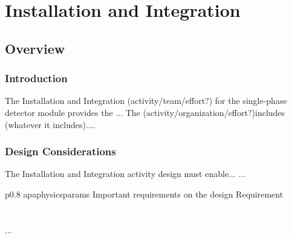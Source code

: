 \chapter{Installation and Integration}
\label{ch:fdsp-install}

\section{Overview}
\label{sec:fdsp-install-ov}


\subsection{Introduction}
\label{sec:fdsp-install-intro}

The Installation and Integration (activity/team/effort?) for the single-phase detector module provides the ...
The (activity/organization/effort?)includes (whatever it includes).... 


\subsection{Design Considerations}
\label{sec:fdsp-install-des-consid}


The Installation and Integration activity design must enable... 
...


\begin{dunetable}
{p{0.8\textwidth}}
{apaphysicsparams}
{Important requirements on the design}   
Requirement  \\ \toprowrule
  \\ \colhline
   \\ \colhline
 ...\\ 
\end{dunetable}



